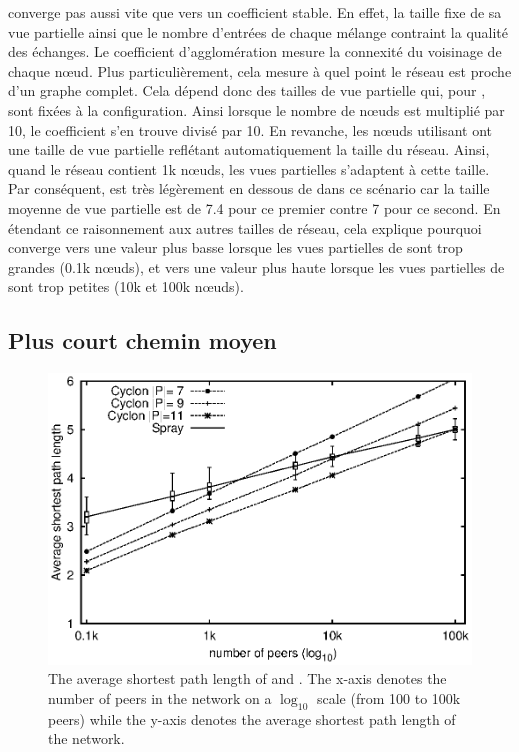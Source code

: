 \begin{itemize}
  converge pas aussi vite que \SPRAY vers un coefficient stable. En effet, la
  taille fixe de sa vue partielle ainsi que le nombre d'entrées de chaque
  mélange contraint la qualité des échanges.  Le coefficient d'agglomération
  mesure la connexité du voisinage de chaque nœud. Plus particulièrement, cela
  mesure à quel point le réseau est proche d'un graphe complet. Cela dépend donc
  des tailles de vue partielle qui, pour \CYCLON, sont fixées à la
  configuration.  Ainsi lorsque le nombre de nœuds est multiplié par 10, le
  coefficient s'en trouve divisé par 10. En revanche, les nœuds utilisant \SPRAY
  ont une taille de vue partielle reflétant automatiquement la taille du réseau.
  Ainsi, quand le réseau contient 1k nœuds, les vues partielles s'adaptent à
  cette taille. Par conséquent, \SPRAY est très légèrement en dessous de \CYCLON
  dans ce scénario car la taille moyenne de vue partielle est de 7.4 pour ce
  premier contre 7 pour ce second. En étendant ce raisonnement aux autres
  tailles de réseau, cela explique pourquoi \SPRAY converge vers une valeur plus
  basse lorsque les vues partielles de \CYCLON sont trop grandes (0.1k nœuds),
  et vers une valeur plus haute lorsque les vues partielles de \CYCLON sont trop
  petites (10k et 100k nœuds).
\end{itemize}

\subsection{Plus court chemin moyen}

\begin{figure}
  \centering
  \includegraphics[width=.8\textwidth]{img/spray/avgpath.eps}
  \caption{\label{fig:spray:avgpath}The average shortest path length of \SPRAY
    and \CYCLON. The x-axis denotes the number of peers in the network on a
    $\log_{10}$ scale (from 100 to 100k peers) while the y-axis denotes the
    average shortest path length of the network.}
\end{figure}

